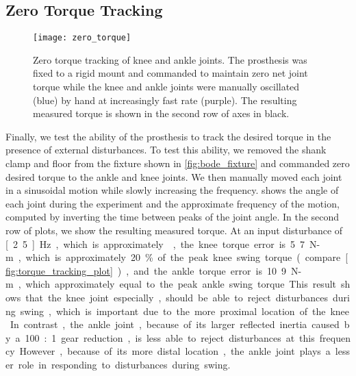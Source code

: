 \subsection{Zero Torque Tracking}
\begin{figure}[b!]
    \centering 
    \texttt{[image: zero\_torque]}
    \caption[Zero torque tracking of knee and ankle joints]{Zero torque tracking
    of knee and ankle joints. The prosthesis was fixed to a rigid mount and
    commanded to maintain zero net joint torque while the knee and ankle joints
    were manually oscillated (blue) by hand at increasingly fast rate (purple).
    The resulting measured torque is shown in the second row of axes in
    black.}\label{fig:pros_eval_zero_torque}
\end{figure}
Finally, we test the ability of the prosthesis to track the desired torque in
the presence of external disturbances. To test this ability, we removed the
shank clamp and floor from the fixture shown in \cref{fig:bode_fixture} and
commanded zero desired torque to the ankle and knee joints. We then manually
moved each joint in a sinusoidal motion while slowly increasing the frequency.
 shows the angle of each joint during the
experiment and the approximate frequency of the motion, computed by inverting
the time between peaks of the joint angle. In the second row of plots, we show
the resulting measured torque. At an input disturbance of \unit[2.5]{Hz}, which
is approximately , the knee torque error is
\unit{5.7}{N-m}, which is approximately 20\% of the peak knee swing torque
(compare \cref{fig:torque_tracking_plot}), and the ankle torque error is
\unit{10.9}{N-m}, which approximately equal to the peak ankle swing torque. This
result shows that the knee joint especially, should be able to reject
disturbances during swing, which is important due to the more proximal location
of the knee. In contrast, the ankle joint, because of its larger reflected
inertia caused by a 100:1 gear reduction, is less able to reject disturbances at
this frequency.  However, because of its more distal location, the ankle joint
plays a lesser role in responding to disturbances during swing. 
